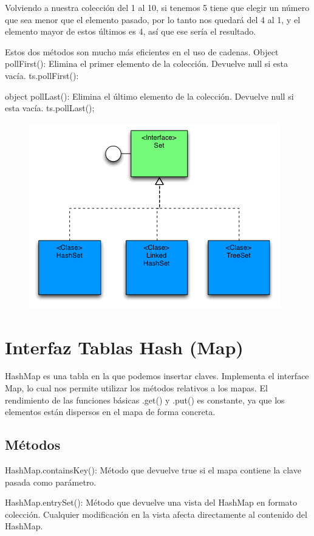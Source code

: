 \documentclass[12pt,a4paper]{report}
\begin{document}
{Volviendo a nuestra colección del 1 al 10, si tenemos 5 tiene que elegir un número que sea menor que el elemento pasado, por lo tanto nos quedará del 4 al 1, y el elemento mayor de estos últimos es 4, así que ese sería el resultado.

Estos dos métodos son mucho más eficientes en el uso de cadenas.
Object pollFirst(): Elimina el primer elemento de la colección. Devuelve null si esta vacía.
ts.pollFirst():

object pollLast(): Elimina el último elemento de la colección. Devuelve null si esta vacía.
ts.pollLast();

\begin{figure}[hbtp]
\centering
\includegraphics[scale=1]{interfazset.PNG}
\end{figure}

\section*{Interfaz Tablas Hash (Map) }
HashMap es una tabla en la que podemos insertar claves. Implementa el interface Map, lo cual nos permite utilizar los métodos relativos a los mapas. El rendimiento de las funciones básicas .get() y .put() es constante, ya que los elementos están dispersos en el mapa de forma concreta.
\subsection*{Métodos}
HashMap.containsKey(): Método que devuelve true si el mapa contiene la clave pasada como parámetro.

HashMap.entrySet(): Método que devuelve una vista del HashMap en formato colección. Cualquier modificación en la vista afecta directamente al contenido del HashMap.

}
\end{document}
